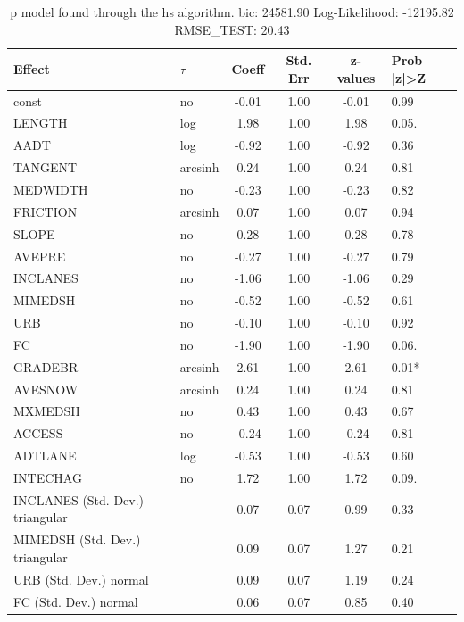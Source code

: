 \begin{table}
	\caption{p model found through the hs algorithm. bic: 24581.90 Log-Likelihood: -12195.82 RMSE_TEST: 20.43}
	\begin{center}
		\begin{tabular}{|l|l|c|c|c|l|}
			\hline
			Effect & $\tau$ & Coeff & Std. Err & z-values & Prob |z|>Z \\
			\hline
			const & no & -0.01 & 1.00 & -0.01 & 0.99 \\
			\hline
			LENGTH & log & 1.98 & 1.00 & 1.98 & 0.05. \\
			\hline
			AADT & log & -0.92 & 1.00 & -0.92 & 0.36 \\
			\hline
			TANGENT & arcsinh & 0.24 & 1.00 & 0.24 & 0.81 \\
			\hline
			MEDWIDTH & no & -0.23 & 1.00 & -0.23 & 0.82 \\
			\hline
			FRICTION & arcsinh & 0.07 & 1.00 & 0.07 & 0.94 \\
			\hline
			SLOPE & no & 0.28 & 1.00 & 0.28 & 0.78 \\
			\hline
			AVEPRE & no & -0.27 & 1.00 & -0.27 & 0.79 \\
			\hline
			INCLANES & no & -1.06 & 1.00 & -1.06 & 0.29 \\
			\hline
			MIMEDSH & no & -0.52 & 1.00 & -0.52 & 0.61 \\
			\hline
			URB & no & -0.10 & 1.00 & -0.10 & 0.92 \\
			\hline
			FC & no & -1.90 & 1.00 & -1.90 & 0.06. \\
			\hline
			GRADEBR & arcsinh & 2.61 & 1.00 & 2.61 & 0.01* \\
			\hline
			AVESNOW & arcsinh & 0.24 & 1.00 & 0.24 & 0.81 \\
			\hline
			MXMEDSH & no & 0.43 & 1.00 & 0.43 & 0.67 \\
			\hline
			ACCESS & no & -0.24 & 1.00 & -0.24 & 0.81 \\
			\hline
			ADTLANE & log & -0.53 & 1.00 & -0.53 & 0.60 \\
			\hline
			INTECHAG & no & 1.72 & 1.00 & 1.72 & 0.09. \\
			\hline
			INCLANES (Std. Dev.) triangular &  & 0.07 & 0.07 & 0.99 & 0.33 \\
			\hline
			MIMEDSH (Std. Dev.) triangular &  & 0.09 & 0.07 & 1.27 & 0.21 \\
			\hline
			URB (Std. Dev.) normal &  & 0.09 & 0.07 & 1.19 & 0.24 \\
			\hline
			FC (Std. Dev.) normal &  & 0.06 & 0.07 & 0.85 & 0.40 \\

\end{tabular}
\end{center}
\end{table}
